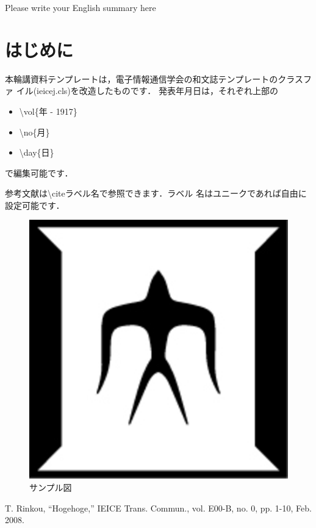 \documentclass[rinkou,a4paper,uplatex]{ieicej}
\begin{document}
\begin{eabstract}
Please write your English summary here
\end{eabstract}

\maketitle

\section{はじめに}
本輪講資料テンプレートは，電子情報通信学会の和文誌テンプレートのクラスファ
イル(ieicej.cls)を改造したものです．
発表年月日は，それぞれ上部の
\begin{itemize}
 \item \textbackslash vol\{年 - 1917\}
 \item \textbackslash no\{月\}
 \item \textbackslash day\{日\}
\end{itemize}
で編集可能です．

参考文献\cite{ref}は\textbackslash cite{ラベル名}で参照できます．ラベル
名はユニークであれば自由に設定可能です．

\begin{figure}[hh]
\centering
\includegraphics[scale=0.5]{fig.eps}
\caption{サンプル図}\label{tsubame}
\end{figure}

\begin{thebibliography}{9} %
 T. Rinkou, ``Hogehoge,'' IEICE Trans. Commun., vol. E00-B, no. 0,
	pp. 1-10, Feb. 2008.
\end{thebibliography}
\end{document}
